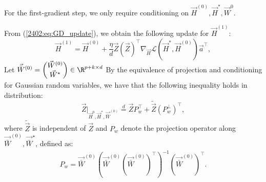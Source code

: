 For the first-gradient step, we only require conditioning on $\vec{H}^{(0)}, \vec{H}^{*}, \vec{W}^{0}$.

From (\eqref{2402:eq:GD_update}), we obtain the following update for $\vec{H}^{(1)}$:
\begin{equation}\label{2402:eq:act_update}
    \vec{H}^{(1)}= \vec{H}^{(0)} + \frac{\eta}{d}\vec{Z}(\vec{Z})^\top  \nabla_{\vec{H}} \mathcal{L}(\vec{H}^*, \vec{H}^{(0)})\vec{a}^\top,
\end{equation}
Let $\vec{\bar{W}}^{(0)} = \begin{pmatrix}
    \vec{W}^{(0)}\\
    \vec{W}^{\star}
\end{pmatrix} \in \R^{p+k \times d}$
By the equivalence of projection and conditioning for Gaussian random variables, we have that the following inequality holds in distribution:
\begin{equation}
\vec{Z}\vert_{\vec{H}^{0},\vec{H}^*,\vec{\bar{W}}^{(0)}} \overset{d}{=} \vec{Z}P_w^\top + \tilde{\vec{Z}}(P^{\perp}_w)^\top,
\end{equation}
where $\tilde{\vec{Z}}$ is independent of $\vec{Z}$ and $P_w$ denote the projection operator along $\vec{\bar{W}}^{(0)},\vec{\bar{W}}^{\star}$, defined as:
\begin{align*}
    P_w = \vec{\bar{W}}^{(0)} (\vec{\bar{W}}^{(0)}(\vec{\bar{W}}^{(0)})^\top)^{-1}(\vec{\bar{W}}^{(0)})^\top. 
\end{align*}


